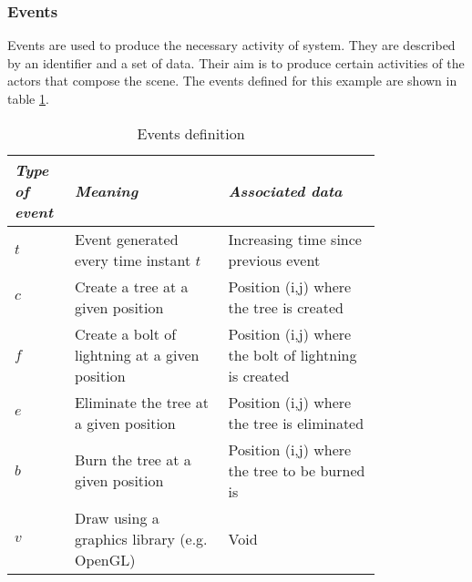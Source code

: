 \documentclass[10pt,journal,letterpaper,compsoc]{IEEEtran}
\begin{document}
\subsubsection{Events
\label{sec:events}}

Events are used to produce the necessary activity of system. They are described by an
identifier and a set of data. Their aim is to produce certain activities of the actors that
compose the scene. The events defined for this example are shown in table \ref{table1}.


\begin{table}[h]
\caption{Events definition}
\label{table1}
\begin{center}
\begin{small}
\begin{tabular}{|p{0.1\linewidth}|p{0.35\linewidth}|p{0.35\linewidth}|}

    \hline
    \itshape Type of event &
    \itshape Meaning &
    \itshape Associated data\\

    \hline
    $t$ &
    Event generated every time instant $t$
    &
    Increasing time since previous event\\

    \hline
    $c$ &
    Create a tree at a given position &
    Position (i,j) where the tree is created \\

    \hline
    $f$ &
    Create a bolt of lightning at a given position &
    Position (i,j) where the bolt of lightning is created\\

    \hline
    $e$ &
    Eliminate the tree at a given position &
    Position (i,j) where the tree is eliminated\\

    \hline
    $b$ &
    Burn the tree at a given position &
    Position (i,j) where the tree to be burned is\\

    \hline
    $v$ &
    Draw using a graphics library (e.g. OpenGL) &
    Void\\

    \hline

\end{tabular}
\end{small}
\end{center}
\end{table}



\end{document}
